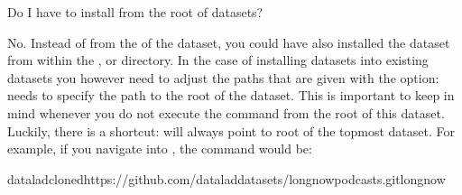 \ignorespaces \begin{findoutmore}[label={fom-clone-nonroot}, before title={\thetcbcounter\ }, float, floatplacement=p, check odd page=true]{Do I have to install from the root of datasets?}
\label{\detokenize{basics/101-105-install:fom-clone-nonroot}}

\sphinxAtStartPar
No. Instead of from the  of the  dataset, you could have also
installed the dataset from within the , or  directory.
In the case of installing datasets into existing datasets you however need
to adjust the paths that are given with the  option:
 needs to specify the path to the root of the dataset. This is
important to keep in mind whenever you do not execute the  command
from the root of this dataset. Luckily, there is a shortcut:  will always
point to root of the top\sphinxhyphen{}most dataset. For example, if you navigate into ,
the command would be:

\begin{sphinxVerbatim}[commandchars=\\\{\}]
dataladclone\PYGZhy{}d\PYGZca{}https://github.com/datalad\PYGZhy{}datasets/longnow\PYGZhy{}podcasts.gitlongnow
\end{sphinxVerbatim}


\end{findoutmore}

